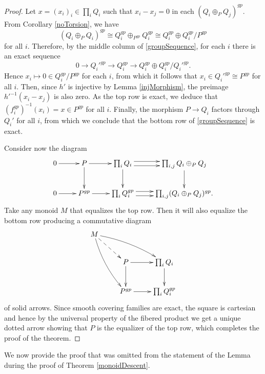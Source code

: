 \documentclass[12pt]{amsart}
\numberwithin{equation}{section}
\theoremstyle{plain}
\theoremstyle{remark}
\begin{document}
\begin{proof}
Let $x = (x_i)_i\in\prod_i Q_i$ such that $x_i - x_j = 0$ in each $(Q_i\oplus_P Q_j)^{gp}$. From Corollary \eqref{noTorsion}, we have
	$$(Q_i\oplus_P Q_i)^{gp} \cong Q_i^{gp}\oplus_{P^{gp}} Q_i^{gp}\cong Q_i^{gp}\oplus Q_i^{gp}/P^{gp}$$
for all $i$. Therefore, by the middle column of \eqref{groupSequence}, for each $i$ there is an exact sequence
	$$0 \to Q_i'^{gp}\to Q_i^{gp}\to Q_i^{gp}\oplus Q_i^{gp}/Q_i'^{gp}.$$
Hence $x_i\mapsto 0\in Q_i^{gp}/P^{gp}$ for each $i$, from which it follows that $x_i\in Q_i'^{gp} \cong P^{gp}$ for all $i$. Then, since $h'$ is injective by Lemma \eqref{injMorphism}, the preimage $h'^{-1}(x_i-x_j)$ is also zero. As the top row is exact, we deduce that $(f_i^{gp})^{-1}(x_i) = x\in P^{gp}$ for all $i$. Finally, the morphism $P\to Q_i$ factors through $Q_i'$ for all $i$, from which we conclude that the bottom row of \eqref{groupSequence} is exact. 

	Consider now the diagram
$$
	\xymatrix{
		0 \ar[r] & P \ar[r]\ar[d] & \prod_i Q_i\ar@<.25pc>[r]\ar[d] \ar@<-.25pc>[r] & \prod_{i,j} Q_i\oplus_P Q_j \ar[d]\\
		0 \ar[r] & P^{gp} \ar[r] & \prod_i Q_i^{gp}\ar@<.25pc>[r] \ar@<-.25pc>[r] & \prod_{i,j} (Q_i\oplus_P Q_j)^{gp}.\\
	}
$$
Take any monoid $M$ that equalizes the top row. Then it will also equalize the bottom row producing a commutative diagram
$$
	\xymatrix{
		M \ar@/^/[drr] \ar@/_/[rdd] \ar@{-->}[dr]  & & \\
		& P \ar[r] \ar[d] & \prod_i Q_i\ar[d]\\
		& P^{gp} \ar[r] & \prod_i Q_i^{gp}\\
	}
$$
of solid arrows. Since smooth covering families are exact, the square is cartesian and hence by the universal property of the fibered product we get a unique dotted arrow showing that $P$ is the equalizer of the top row, which completes the proof of the theorem.
\end{proof}
We now provide the proof that was omitted from the statement of the Lemma during the proof of Theorem \eqref{monoidDescent}.
\end{document}
